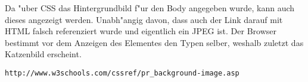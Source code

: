 \documentclass[11pt, oneside, BCOR0mm, DIV9, headinclude]{scrartcl}
\begin{document}
\begin{enumerate}
		Da "uber CSS das Hintergrundbild f"ur den Body angegeben wurde, kann auch dieses angezeigt
		werden. Unabh"angig davon, dass auch der Link darauf mit HTML falsch referenziert wurde
		und eigentlich ein JPEG ist. Der Browser bestimmt vor dem Anzeigen des Elementes den Typen 
		selber, weshalb zuletzt das Katzenbild erscheint.
		\begin{verbatim}http://www.w3schools.com/cssref/pr_background-image.asp\end{verbatim}

\end{enumerate}
\end{document}
